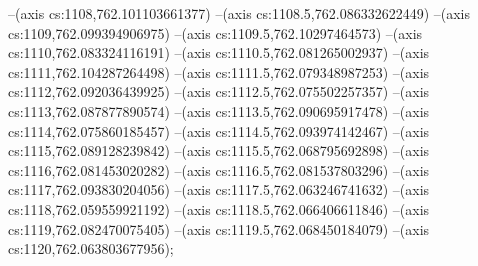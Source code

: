 --(axis cs:1108,762.101103661377)
--(axis cs:1108.5,762.086332622449)
--(axis cs:1109,762.099394906975)
--(axis cs:1109.5,762.10297464573)
--(axis cs:1110,762.083324116191)
--(axis cs:1110.5,762.081265002937)
--(axis cs:1111,762.104287264498)
--(axis cs:1111.5,762.079348987253)
--(axis cs:1112,762.092036439925)
--(axis cs:1112.5,762.075502257357)
--(axis cs:1113,762.087877890574)
--(axis cs:1113.5,762.090695917478)
--(axis cs:1114,762.075860185457)
--(axis cs:1114.5,762.093974142467)
--(axis cs:1115,762.089128239842)
--(axis cs:1115.5,762.068795692898)
--(axis cs:1116,762.081453020282)
--(axis cs:1116.5,762.081537803296)
--(axis cs:1117,762.093830204056)
--(axis cs:1117.5,762.063246741632)
--(axis cs:1118,762.059559921192)
--(axis cs:1118.5,762.066406611846)
--(axis cs:1119,762.082470075405)
--(axis cs:1119.5,762.068450184079)
--(axis cs:1120,762.063803677956);


